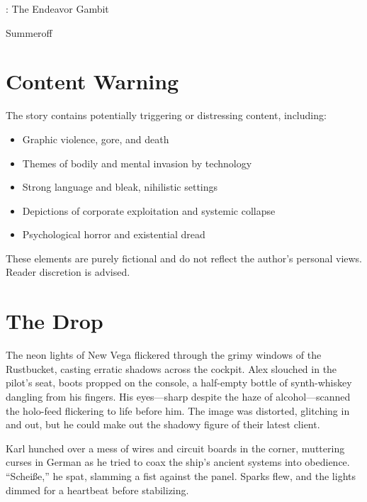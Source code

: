 \documentclass[12pt]{book}
\begin{document}
\begin{titlepage}
    \centering
    \vspace*{3cm}
    {\fontsize{48}{60}: The Endeavor Gambit\par} %
    \vspace{2cm}
    {\Large Summeroff\par} %
\end{titlepage}
\clearpage

\chapter*{Content Warning}
The story contains potentially triggering or distressing content, including:
\begin{itemize}
    \item Graphic violence, gore, and death
    \item Themes of bodily and mental invasion by technology
    \item Strong language and bleak, nihilistic settings
    \item Depictions of corporate exploitation and systemic collapse
    \item Psychological horror and existential dread
\end{itemize}
These elements are purely fictional and do not reflect the author’s personal views. Reader discretion is advised.
\clearpage
\tableofcontents
\clearpage

\chapter{The Drop}

The neon lights of New Vega flickered through the grimy windows of the Rustbucket, casting erratic shadows across the cockpit. Alex slouched in the pilot’s seat, boots propped on the console, a half-empty bottle of synth-whiskey dangling from his fingers. His eyes—sharp despite the haze of alcohol—scanned the holo-feed flickering to life before him. The image was distorted, glitching in and out, but he could make out the shadowy figure of their latest client.

Karl hunched over a mess of wires and circuit boards in the corner, muttering curses in German as he tried to coax the ship’s ancient systems into obedience. “Scheiße,” he spat, slamming a fist against the panel. Sparks flew, and the lights dimmed for a heartbeat before stabilizing.
\end{document}
